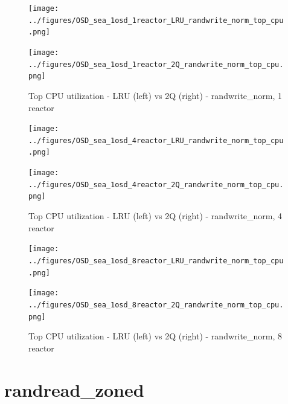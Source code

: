 \begin{figure}[!ht]
  \centering
  \begin{minipage}{.5\textwidth}
  \centering
    \texttt{[image: ../figures/OSD\_sea\_1osd\_1reactor\_LRU\_randwrite\_norm\_top\_cpu.png]}
  \end{minipage}%
  \begin{minipage}{.5\textwidth}
  \centering
    \texttt{[image: ../figures/OSD\_sea\_1osd\_1reactor\_2Q\_randwrite\_norm\_top\_cpu.png]}
  \end{minipage}%
  \caption{Top CPU utilization - LRU (left) vs 2Q (right) - randwrite\_norm, 1 reactor}
  \label{figure:1-reactor-cpu-randwrite_norm}
\end{figure}


\begin{figure}[!ht]
  \centering
  \begin{minipage}{.5\textwidth}
  \centering
    \texttt{[image: ../figures/OSD\_sea\_1osd\_4reactor\_LRU\_randwrite\_norm\_top\_cpu.png]}
  \end{minipage}%
  \begin{minipage}{.5\textwidth}
  \centering
    \texttt{[image: ../figures/OSD\_sea\_1osd\_4reactor\_2Q\_randwrite\_norm\_top\_cpu.png]}
  \end{minipage}%
  \caption{Top CPU utilization - LRU (left) vs 2Q (right) - randwrite\_norm, 4 reactor}
  \label{figure:4-reactor-cpu-randwrite_norm}
\end{figure}


\begin{figure}[!ht]
  \centering
  \begin{minipage}{.5\textwidth}
  \centering
    \texttt{[image: ../figures/OSD\_sea\_1osd\_8reactor\_LRU\_randwrite\_norm\_top\_cpu.png]}
  \end{minipage}%
  \begin{minipage}{.5\textwidth}
  \centering
    \texttt{[image: ../figures/OSD\_sea\_1osd\_8reactor\_2Q\_randwrite\_norm\_top\_cpu.png]}
  \end{minipage}%
  \caption{Top CPU utilization - LRU (left) vs 2Q (right) - randwrite\_norm, 8 reactor}
  \label{figure:8-reactor-cpu-randwrite_norm}
\end{figure}


\pagebreak
\section{randread\_zoned}

